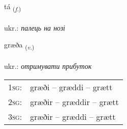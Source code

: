 \documentclass[frontgrid, backgrid]{flacards}\usepackage[]{graphicx}\usepackage[]{xcolor}
\begin{document}
\renewcommand{\flhead}{\vskip5pt \fboxsep=0pt {\small\bfseries\footnotesize Nafnorð | іменник}}
\renewcommand{\fcfoot}{\vskip5pt \fboxsep=0pt \hspace{2pt}{\small\bfseries\footnotesize 3K}}

\renewcommand{\blhead}{\vskip5pt {\small\bfseries\footnotesize Nafnorð | іменник }}
\renewcommand{\bcfoot}{\vskip5pt \hspace{2pt}{\small\bfseries\footnotesize 3K}}


{tá \small{\textsubscript{(\textit{f.})}} \\[1ex] %
\textphonetic{[tʰauː]} \\
ukr.: \emph{палець на нозі} \\  [2ex]
\renewcommand*{\arraystretch}{0.8}
}

\renewcommand{\flhead}{\vskip5pt \fboxsep=0pt {\small\bfseries\footnotesize Sagnorð | дієслово}}
\renewcommand{\fcfoot}{\vskip5pt \fboxsep=0pt \hspace{2pt}{\small\bfseries\footnotesize 3K}}

\renewcommand{\blhead}{\vskip5pt {\small\bfseries\footnotesize Sagnorð | дієслово }}
\renewcommand{\bcfoot}{\vskip5pt \hspace{2pt}{\small\bfseries\footnotesize 3K}}


{græða \small{\textsubscript{(\textit{v.})}} \\[1ex] %
\textphonetic{[kraiːða]} \\
ukr.: \emph{отримувати прибуток} \\  [2ex]
\renewcommand*{\arraystretch}{0.8}
\begin{tabular}{p{1cm}l}
\textsc{1sg}: & græði -- græddi -- grætt \\ 
\textsc{2sg}: & græðir -- græddir -- grætt \\ 
\textsc{3sg}: & græðir -- græddi -- grætt \\ 
\end{tabular}
}
\end{document}
